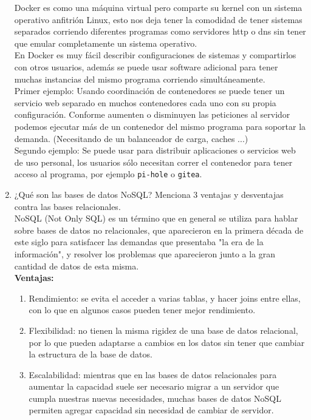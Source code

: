 \documentclass[12pt,a4paper]{article}
\begin{document}
\begin{enumerate}
        Docker es como una máquina virtual pero comparte su kernel con un sistema operativo
        anfitrión Linux, esto nos deja tener la comodidad de tener sistemas separados
        corriendo diferentes programas como servidores http o dns sin tener que emular
        completamente un sistema operativo.\\

        En Docker es muy fácil describir configuraciones de sistemas y compartirlos
        con otros usuarios, además se puede usar software adicional para tener muchas
        instancias del mismo programa corriendo simultáneamente.\\

        Primer ejemplo: Usando coordinación de contenedores se puede tener un servicio
        web separado en muchos contenedores cada uno con su propia configuración.
        Conforme aumenten o disminuyen las peticiones al servidor podemos ejecutar
        más de un contenedor del mismo programa para soportar la demanda.
        (Necesitando de un balanceador de carga, caches ...)\\

        Segundo ejemplo: Se puede usar para distribuir aplicaciones o servicios
        web de uso personal, los usuarios sólo necesitan correr el contenedor
        para tener acceso al programa, por ejemplo \texttt{pi-hole} o \texttt{gitea}.\\

    \item ¿Qué son las bases de datos NoSQL? Menciona 3 ventajas y desventajas contra
        las bases relacionales.\\

        NoSQL (Not Only SQL) es un término que en general se utiliza para hablar
        sobre bases de datos no relacionales, que aparecieron en la primera década
        de este siglo para satisfacer las demandas que presentaba "la era de la
        información", y resolver los problemas que aparecieron junto a la gran cantidad
        de datos de esta misma.\\
        
        \textbf{Ventajas:}\\
        \begin{enumerate}
            \item Rendimiento: se evita el acceder a varias tablas, y hacer joins entre ellas, con lo que en algunos casos pueden tener mejor rendimiento.
            \item Flexibilidad: no tienen la misma rigidez de una base de datos relacional, por lo que pueden adaptarse a cambios en los datos sin tener que cambiar la estructura de la base de datos.
            \item Escalabilidad: mientras que en las bases de datos relacionales para aumentar la capacidad suele ser necesario migrar a un servidor que cumpla nuestras nuevas necesidades, muchas bases de datos NoSQL permiten agregar capacidad sin necesidad de cambiar de servidor.
        \end{enumerate}
        

\end{enumerate}
\end{document}
